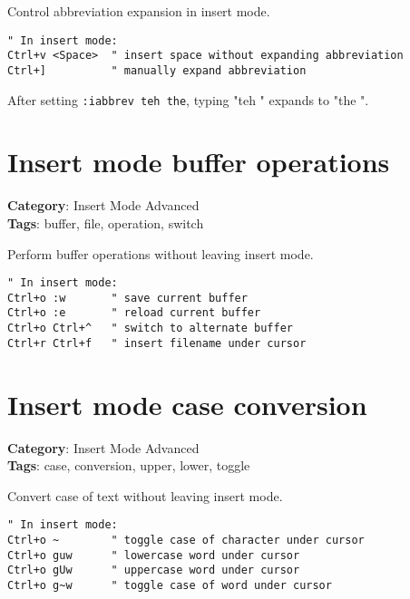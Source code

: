 {{{{{{Control abbreviation expansion in insert mode.

\begin{Exa*}{}
\begin{Verbatim}[fontsize=\footnotesize, breaklines, breakanywhere]
" In insert mode:
Ctrl+v <Space>  " insert space without expanding abbreviation
Ctrl+]          " manually expand abbreviation
\end{Verbatim}
\end{Exa*}

After setting {\footnotesize \Verb§:iabbrev teh the§}, typing "teh " expands to "the ".

\section{Insert mode buffer operations}

\textbf{Category}: Insert Mode Advanced\\ \textbf{Tags}: buffer, file, operation, switch
\vspace{0.5cm}

Perform buffer operations without leaving insert mode.

\begin{Exa*}{}
\begin{Verbatim}[fontsize=\footnotesize, breaklines, breakanywhere]
" In insert mode:
Ctrl+o :w       " save current buffer
Ctrl+o :e       " reload current buffer
Ctrl+o Ctrl+^   " switch to alternate buffer
Ctrl+r Ctrl+f   " insert filename under cursor
\end{Verbatim}
\end{Exa*}

\section{Insert mode case conversion}

\textbf{Category}: Insert Mode Advanced\\ \textbf{Tags}: case, conversion, upper, lower, toggle
\vspace{0.5cm}

Convert case of text without leaving insert mode.

\begin{Exa*}{}
\begin{Verbatim}[fontsize=\footnotesize, breaklines, breakanywhere]
" In insert mode:
Ctrl+o ~        " toggle case of character under cursor  
Ctrl+o guw      " lowercase word under cursor
Ctrl+o gUw      " uppercase word under cursor
Ctrl+o g~w      " toggle case of word under cursor
\end{Verbatim}
\end{Exa*}

}}}}}}
